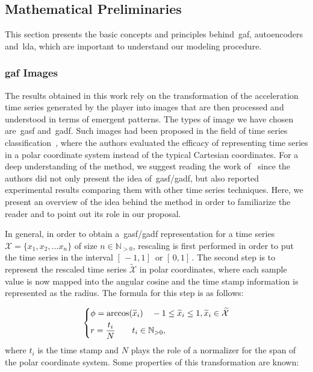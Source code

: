\subsection{Mathematical Preliminaries}
This section presents the basic concepts and principles behind~\gls{gaf}, autoencoders and~\gls{lda}, which are important to understand our modeling procedure.

\subsubsection{\glsdesc{gaf} Images}

The results obtained in this work rely on the transformation of the acceleration time series generated by the player into images that are then processed and understood in terms of emergent patterns. The types of image we have chosen are~\gls{gasf} and~\gls{gadf}. Such images had been proposed in the field of time series classification~\citep{wang_imaging_2015}, where the authors evaluated the efficacy of representing time series in a polar coordinate system instead of the typical Cartesian coordinates. For a deep understanding of the method, we suggest reading the work of~\cite{wang_imaging_2015} since the authors did not only present the idea of~\gls{gasf}/\gls{gadf}, but also reported experimental results comparing them with other time series techniques. Here, we present an overview of the idea behind the method in order to familiarize the reader and to point out its role in our proposal.

In general, in order to obtain a~\gls{gasf}/\gls{gadf} representation for a time series $\mathcal{X}=\{x_{1}, x_{2}, ... x_{n}\}$ of size $n \in \mathbb{N}_{>0}$, rescaling is first performed in order to put the time series in the interval $[\,-1,1] \,$ or $[\,0,1]\,$. The second step is to represent the rescaled time series $\widetilde{\mathcal{X}}$ in polar coordinates, where each sample value is now mapped into the angular cosine and the time stamp information is represented as the radius. 
The formula for this step is as follows:

\begin{equation}
\begin{dcases}
  \phi = \arccos(\widetilde{x}_{i}) \quad -1 \leq \widetilde{x}_{i} \leq 1, \widetilde{x}_{i} \in \widetilde{\mathcal{X}} \\
  r = \frac{t_{i}}{N} \quad \quad t_{i} \in \mathbb{N}_{>0},
\end{dcases}
\label{equation:GAF}
\end{equation} 
where $t_{i}$ is the time stamp and $N$ plays the role of a normalizer for the span of the polar coordinate system. Some properties of this transformation are known:

